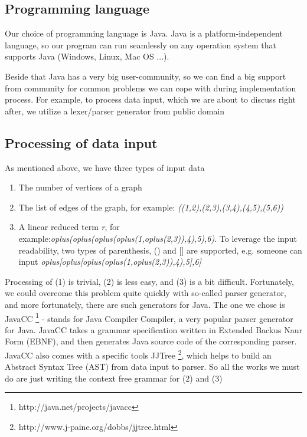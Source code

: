 \documentclass[a4paper, 12pt]{article}
\begin{document}
\subsection{Programming language}
Our choice of programming language is Java. Java is a platform-independent language, so our program can run seamlessly on any operation system that supports Java (Windows, Linux, Mac OS ...). 

Beside that Java has a very big user-community, so we can find a big support from community for common problems we can cope with during implementation process. For example, to process data input, which we are about to discuss right after, we utilize a lexer/parser generator from public domain

\subsection{Processing of data input}

As mentioned above, we have three types of input data 
\begin{enumerate}
\item The number of vertices of a graph 
\item The list of edges of the graph, for example: \textit {((1,2),(2,3),(3,4),(4,5),(5,6))}
\item A linear reduced term \textit {r}, for example:\textit {oplus(oplus(oplus(oplus(1,oplus(2,3)),4),5),6)}. To leverage the input readability, two types of parenthesis, () and {[}{]} are supported, e.g. someone can input \textit {oplus{[}oplus{[}oplus(oplus(1,oplus(2,3)),4),5{]},6{]}}
\end{enumerate}

Processing of (1) is trivial, (2) is less easy, and (3) is a bit difficult. Fortunately, we could overcome this problem quite quickly with so-called parser generator, and more fortunately, there are such
generators for Java. The one we chose is JavaCC \footnote {http://java.net/projects/javacc} - stands for Java Compiler Compiler, a very popular parser generator for Java. JavaCC takes a grammar specification written in Extended Backus Naur Form (EBNF), and then generates Java source code of the corresponding parser. JavaCC also comes with a specific tools JJTree \footnote {http://www.j-paine.org/dobbs/jjtree.html}, which helps to build an Abstract Syntax Tree (AST) from data input to parser. So all the works we must do are just writing the context free grammar for (2) and (3) 
\end{document}
